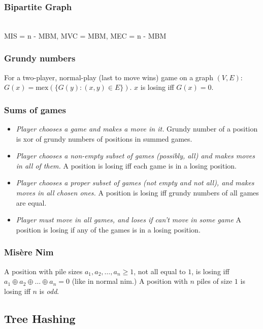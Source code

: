 {\subsubsection{Bipartite Graph} \\
MIS = n - MBM, MVC = MBM, MEC = n - MBM \\

\subsubsection{Grundy numbers}
For a two-player, normal-play (last to move wins) game on a graph $(V,E)$:
$G(x) = \mbox{mex}(\{ G(y) : (x, y) \in E \})$. $x$ is losing iff $G(x) = 0$.

\subsubsection{Sums of games}
\begin{itemize}[leftmargin=*, noitemsep]
  \item
    \emph{Player chooses a game and makes a move in it.}
    Grundy number of a position is xor of grundy numbers of positions in summed games.
  \item
    \emph{Player chooses a non-empty subset of games (possibly, all) and makes moves in all of them.}
    A position is losing iff each game is in a losing position.
  \item
    \emph{Player chooses a proper subset of games (not empty and not all),
        and makes moves in all chosen ones.}
    A position is losing iff grundy numbers of all games are equal. 
  \item
    \emph{Player must move in all games, and loses if can't move in some game}
    A position is losing if any of the games is in a losing position.
\end{itemize}

\subsubsection{Mis\`{e}re Nim}
A position with pile sizes $a_1, a_2, \dots, a_n \ge 1$,
not all equal to $1$, is losing iff $a_1 \oplus a_2 \oplus \dots \oplus a_n = 0$
(like in normal nim.)
A position with $n$ piles of size $1$ is losing iff $n$ is \emph{odd}.

\subsection{Tree Hashing}

}
